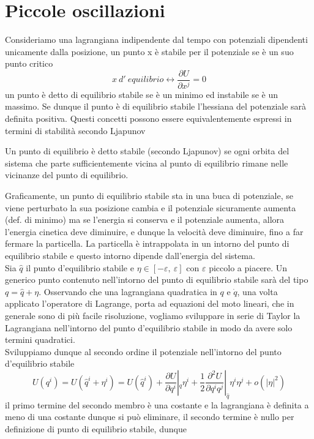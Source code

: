 \documentclass[
10pt, %
a4paper, %
oneside, %
headinclude,footinclude, %
BCOR5mm, %
]{scrartcl}
\begin{document}
\section{Piccole oscillazioni}
Consideriamo una lagrangiana indipendente dal tempo con potenziali dipendenti unicamente dalla posizione, un punto x è stabile per il potenziale se è un suo punto critico
\[x\ d'\ equilibrio \leftrightarrow \frac{\partial U}{\partial x^j} = 0\]
un punto è detto di equilibrio stabile se è un minimo ed instabile se è un massimo. Se dunque il punto è di equilibrio stabile l'hessiana del potenziale sarà definita positiva. Questi concetti possono essere equivalentemente espressi in termini di stabilità secondo Ljapunov
\begin{definizione}
	Un punto di equilibrio è detto stabile (secondo Ljapunov) se ogni orbita del sistema che parte sufficientemente vicina al punto di equilibrio rimane nelle vicinanze del punto di equilibrio.
\end{definizione}
Graficamente, un punto di equilibrio stabile sta in una buca di potenziale, se viene perturbato la sua posizione cambia e il potenziale sicuramente aumenta (def. di minimo) ma se l'energia si conserva e il potenziale aumenta, allora l'energia cinetica deve diminuire, e dunque la velocità deve diminuire, fino a far fermare la particella. La particella è intrappolata in un intorno del punto di equilibrio stabile e questo intorno dipende dall'energia del sistema.\\
Sia \(\hat{q}\) il punto d'equilibrio stabile e \(\eta\in [-\varepsilon,\ \varepsilon]\) con $\varepsilon$ piccolo a piacere. Un generico punto contenuto nell'intorno del punto di equilibrio stabile sarà del tipo \(q = \hat{q}+\eta\).
Osservando che una lagrangiana quadratica in \(q\) e \(\dot{q}\), una volta applicato l'operatore di Lagrange, porta ad equazioni del moto lineari, che in generale sono di più facile risoluzione, vogliamo sviluppare in serie di Taylor la Lagrangiana nell'intorno del punto d'equilibrio stabile in modo da avere solo termini quadratici.\\  
Sviluppiamo dunque al secondo ordine il potenziale nell'intorno del punto d'equilibrio stabile
\[U(q^i) = U(\hat{q}^i+\eta^i) = U(\hat{q}^i) + \frac{\partial U}{\partial q^i}|_{\hat{q}}\eta^i + \frac{1}{2} \frac{\partial^2 U}{\partial q^iq^j}|_{\hat{q}}\eta^i\eta^j+o(|\eta|^2)\]
il primo termine del secondo membro è una costante e la lagrangiana è definita a meno di una costante dunque si può eliminare, il secondo termine è nullo per definizione di punto di equilibrio stabile, dunque
\end{document}
